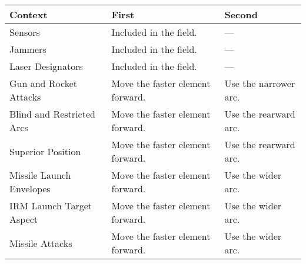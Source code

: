 
\begin{twocolumntablefloat}

\begin{twocolumntable}

\small
\begin{tabularx}{0.7\linewidth}{lLl}
\toprule
Context&First&Second\\
\midrule
Sensors&Included in the field.&---\\
Jammers&Included in the field.&---\\
Laser Designators&Included in the field.&---\\
Gun and Rocket Attacks&Move the faster element forward.&Use the narrower arc.\\
Blind and Restricted Arcs&Move the faster element forward.&Use the rearward arc.\\
Superior Position&Move the faster element forward.&Use the rearward arc.\\
Missile Launch Envelopes&Move the faster element forward.&Use the wider arc.\\
IRM Launch Target Aspect&Move the faster element forward.&Use the wider arc.\\
Missile Attacks&Move the faster element forward.&Use the wider arc.\\
\bottomrule
\end{tabularx}


\end{twocolumntable}

\vspace{\floatsep}

\begin{twocolumntable}



\end{twocolumntable}
\end{twocolumntablefloat}
